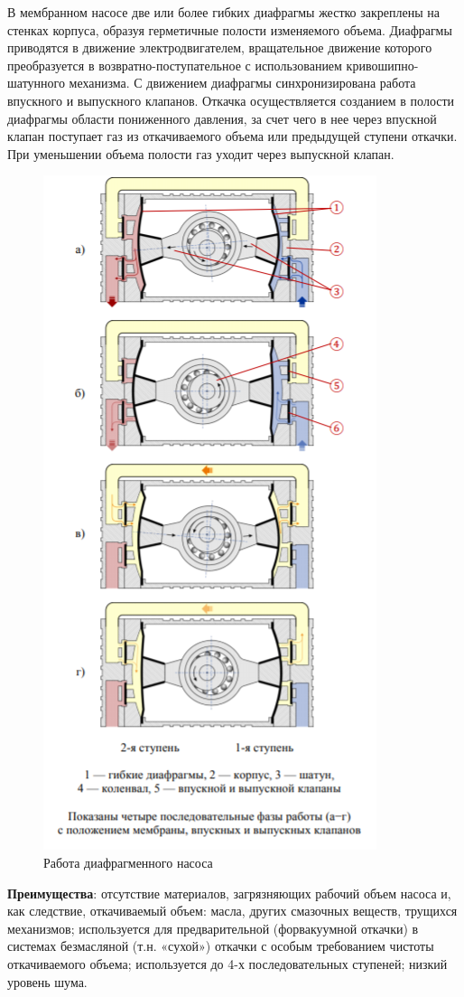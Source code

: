 \documentclass[a4paper, 12pt]{article} %
\begin{document}
В мембранном насосе две или более гибких диафрагмы жестко закреплены на стенках корпуса, образуя герметичные полости изменяемого объема. Диафрагмы приводятся в движение
электродвигателем, вращательное движение которого преобразуется
в возвратно-поступательное с использованием кривошипно-шатунного
механизма. С движением диафрагмы синхронизирована работа
впускного и выпускного клапанов. Откачка осуществляется созданием
в полости диафрагмы области пониженного давления, за счет чего в нее через впускной клапан поступает газ из откачиваемого объема или предыдущей ступени откачки. При уменьшении объема полости газ уходит через выпускной клапан.

\begin{figure}[h]
    \centering
    \includegraphics[width = 7.5 cm]{ДН}
    \caption{Работа диафрагменного насоса}
    \label{fig:vac}
\end{figure}

\textbf{Преимущества}: отсутствие материалов, загрязняющих рабочий
объем насоса и, как следствие, откачиваемый объем: масла, других смазочных веществ, трущихся механизмов; используется для предварительной (форвакуумной откачки) в системах безмасляной (т.н. «сухой») откачки с особым требованием чистоты откачиваемого объема; используется до 4-х последовательных ступеней; низкий уровень шума.
\end{document}
